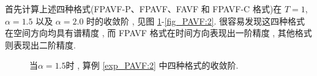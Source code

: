 	首先计算上述四种格式(FPAVF-P、FPAVF、FAVF 和 FPAVF-C 格式)在 $T=1$, $\alpha=1.5$ 以及 $\alpha=2.0$  时的收敛阶 , 见图 \ref{fig_PAVF:1}-\ref{fig_PAVF:2}.
	很容易发现这四种格式在空间方向均具有谱精度 , 而 FPAVF 格式在时间方向表现出一阶精度 , 其他格式则表现出二阶精度.	
		
\begin{figure}[H]
	\begin{center}
	\caption{当$\alpha=1.5$时 , 算例 \ref{exp_PAVF:2}  中四种格式的收敛阶.}
	 \label{fig_PAVF:1}
	\end{center}
	\end{figure}

